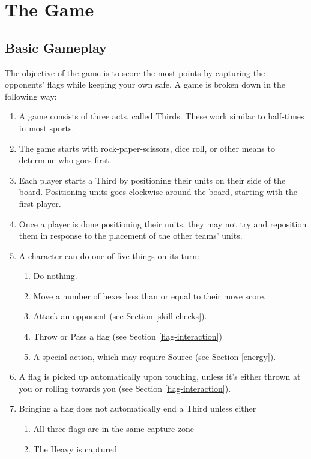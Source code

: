 \chapter{The Game}
\section{Basic Gameplay} \label{basic-gameplay}
The objective of the game is to score the most points by capturing the opponents' flags while keeping your own safe.
A game is broken down in the following way:
\begin{enumerate}
    \item A game consists of three acts, called Thirds.
    These work similar to half-times in most sports.
    \item The game starts with rock-paper-scissors, dice roll, or other means to determine who goes first.
    \item Each player starts a Third by positioning their units on their side of the board.
    Positioning units goes clockwise around the board, starting with the first player.
    \item Once a player is done positioning their units, they may not try and reposition them in response to the placement of the other teams’ units.
    \item A character can do one of five things on its turn:
    \begin{enumerate}
        \item Do nothing.
        \item Move a number of hexes less than or equal to their move score.
        \item Attack an opponent (see Section \ref{skill-checks}).
        \item Throw or Pass a flag (see Section \ref{flag-interaction})
        \item A special action, which may require Source (see Section \ref{energy}).
    \end{enumerate}
    \item A flag is picked up automatically upon touching, unless it’s either thrown at you or rolling towards you (see Section \ref{flag-interaction}).
    \item Bringing a flag does not automatically end a Third unless either
    \begin{enumerate}
        \item All three flags are in the same capture zone
        \item The Heavy is captured
    \end{enumerate}
\end{enumerate}


%


%


